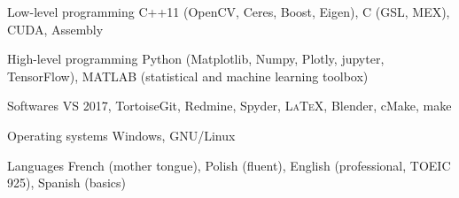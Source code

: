 


\begin{cvskills}


\cvskill
{Low-level programming} %
{C++11 (OpenCV, Ceres, Boost, Eigen), C (GSL, MEX), CUDA, Assembly} %


\cvskill
{High-level programming} %
{Python (Matplotlib, Numpy, Plotly, jupyter, TensorFlow), MATLAB (statistical and machine learning toolbox)} %


\cvskill
{Softwares} %
{VS 2017, TortoiseGit, Redmine, Spyder, \textsc{\LaTeX}, Blender, cMake, make} %


\cvskill
{Operating systems} %
{Windows, GNU/Linux} %


\cvskill
{Languages} %
{French (mother tongue), Polish (fluent), English (professional, TOEIC 925), Spanish (basics)} %


\end{cvskills}
